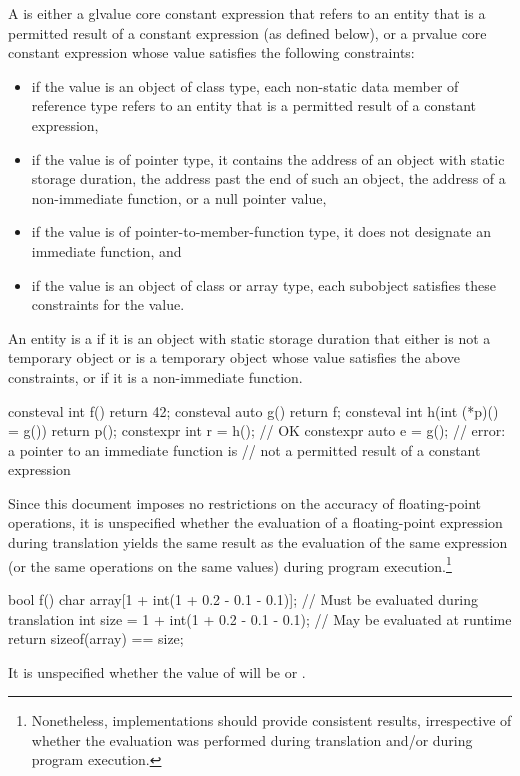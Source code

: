 \pnum
A  is either
a glvalue core constant expression that refers to
an entity that is a permitted result of a constant expression (as defined below), or
a prvalue core constant expression whose value
satisfies the following constraints:
\begin{itemize}
  \item
  if the value is an object of class type,
  each non-static data member of reference type refers to
  an entity that is a permitted result of a constant expression,
  \item
  if the value is of pointer type, it contains
  the address of an object with static storage duration,
  the address past the end of such an object,
  the address of a non-immediate function,
  or a null pointer value,

  \item
  if the value is of pointer-to-member-function type,
  it does not designate an immediate function, and

  \item
  if the value is an object of class or array type,
  each subobject satisfies these constraints for the value.
\end{itemize}
An entity is a
if it is an
object with static storage duration that either is not a temporary object or is
a temporary object whose value satisfies the above constraints, or if
it is a non-immediate function.
\begin{example}
\begin{codeblock}
consteval int f() { return 42; }
consteval auto g() { return f; }
consteval int h(int (*p)() = g()) { return p(); }
constexpr int r = h();                          // OK
constexpr auto e = g();                         // error: a pointer to an immediate function is
                                                // not a permitted result of a constant expression
\end{codeblock}
\end{example}

\pnum
\begin{note}
Since this document
imposes no restrictions on the accuracy of floating-point operations, it is unspecified whether the
evaluation of a floating-point expression during translation yields the same result as the
evaluation of the same expression (or the same operations on the same values) during program
execution.\footnote{Nonetheless, implementations should provide consistent results,
irrespective of whether the evaluation was performed during translation and/or during program
execution.}
\begin{example}
\begin{codeblock}
bool f() {
    char array[1 + int(1 + 0.2 - 0.1 - 0.1)];   // Must be evaluated during translation
    int size = 1 + int(1 + 0.2 - 0.1 - 0.1);    // May be evaluated at runtime
    return sizeof(array) == size;
}
\end{codeblock}
It is unspecified whether the value of  will be  or .
\end{example}
\end{note}

